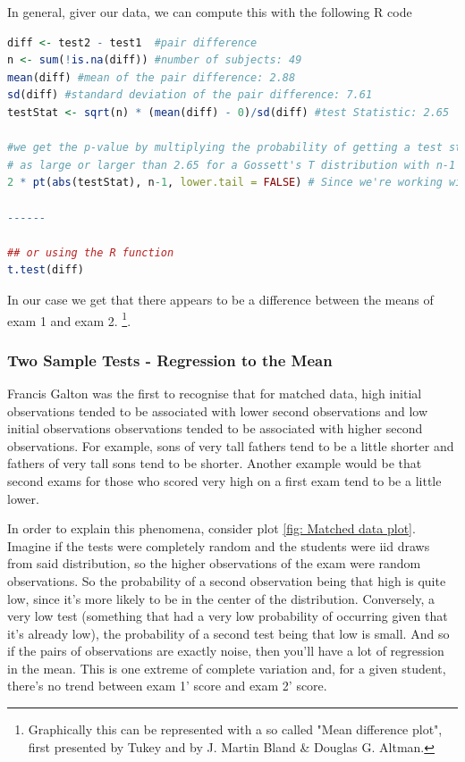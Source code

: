 \documentclass{homework}
\begin{document}
In general, giver our data, we can compute this with the following R code 

\begin{lstlisting}[language=R]
diff <- test2 - test1  #pair difference
n <- sum(!is.na(diff)) #number of subjects: 49
mean(diff) #mean of the pair difference: 2.88
sd(diff) #standard deviation of the pair difference: 7.61
testStat <- sqrt(n) * (mean(diff) - 0)/sd(diff) #test Statistic: 2.65

#we get the p-value by multiplying the probability of getting a test statistic 
# as large or larger than 2.65 for a Gossett's T distribution with n-1 dof by two, since it's a two sided test
2 * pt(abs(testStat), n-1, lower.tail = FALSE) # Since we're working with 48 dof, there's little diference from calculating a pnorm or a pt

------

## or using the R function
t.test(diff)
\end{lstlisting}

In our case we get that there appears to be a difference between the means of exam 1 and exam 2. \footnote{Graphically this can be represented with a so called "Mean difference plot", first presented by Tukey and by J. Martin Bland \& Douglas G. Altman.}. \\

\subsubsection{Two Sample Tests - Regression to the Mean}

Francis Galton was the first to recognise that for matched data, high initial observations tended to be associated with lower second observations and low initial observations observations tended to be associated with higher second observations. For example, sons of very tall fathers tend to be a little shorter and fathers of very tall sons tend to be shorter. Another example would be that second exams for those who scored very high on a first exam tend to be a little lower. 

In order to explain this phenomena, consider plot \ref{fig: Matched data plot}. Imagine if the tests were completely random and the students were iid draws from said distribution, so the higher observations of the exam were random observations. So the probability of a second observation being that high is quite low, since it's more likely to be in the center of the distribution. Conversely, a very low test (something that had a very low probability of occurring given that it's already low), the probability of a second test being that low is small. And so if the pairs of observations are exactly noise, then you'll have a lot of regression in the mean. This is one extreme of complete variation and, for a given student, there's no trend between exam 1' score and exam 2' score.
\end{document}
